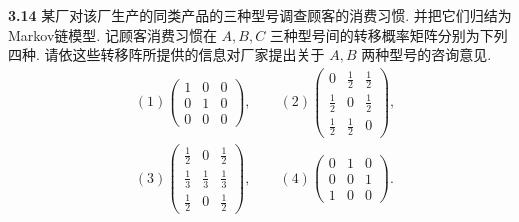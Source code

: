 \documentclass{article}
\newenvironment{problem}[1]{\begin{framed}\par\noindent\textbf{#1} }{\end{framed}\par}
\begin{document}
\begin{problem}{3.14}
	某厂对该厂生产的同类产品的三种型号调查顾客的消费习惯. 并把它们归结为Markov链模型. 记顾客消费习惯在 $A, B, C $ 三种型号间的转移概率矩阵分别为下列四种. 请依这些转移阵所提供的信息对厂家提出关于 $A, B$ 两种型号的咨询意见.
	\[
		\begin{split}
		&(1)\begin{pmatrix}
				1 & 0 & 0\\
				0 & 1 & 0\\
				0 & 0 & 0
			\end{pmatrix},\qquad
		(2)\begin{pmatrix}
				0 & \frac{1}{2} & \frac{1}{2}\\
				\frac{1}{2} & 0 & \frac{1}{2}\\
				\frac{1}{2} & \frac{1}{2} & 0
			\end{pmatrix},\\
		&(3)\begin{pmatrix}
				\frac{1}{2} & 0 & \frac{1}{2}\\
				\frac{1}{3} & \frac{1}{3} & \frac{1}{3}\\
				\frac{1}{2} & 0 & \frac{1}{2}
			\end{pmatrix},\qquad
		(4)\begin{pmatrix}
				0 & 1 & 0\\
				0 & 0 & 1\\
				1 & 0 & 0
			\end{pmatrix}.
		\end{split}
	\]
\end{problem}
\end{document}
